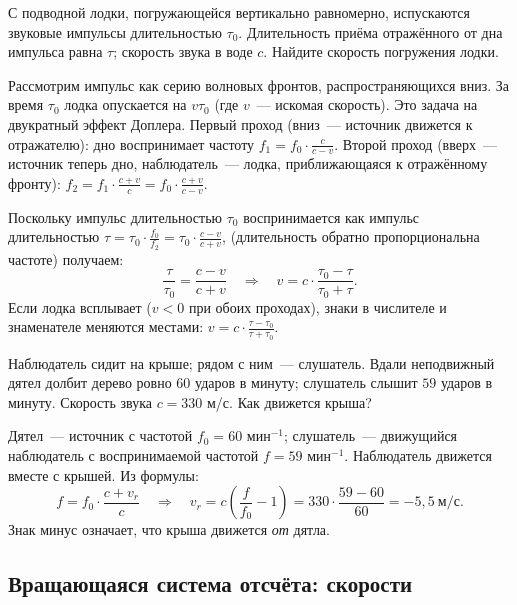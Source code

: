 \documentclass[../main.tex]{subfiles}
\begin{document}
\begin{example}
С подводной лодки, погружающейся вертикально равномерно,
испускаются звуковые импульсы длительностью $\tau_0$.
Длительность приёма отражённого от дна импульса равна $\tau$;
скорость звука в воде $c$. Найдите скорость погружения лодки.

Рассмотрим импульс как серию волновых фронтов,
распространяющихся вниз. За время $\tau_0$ лодка опускается
на $v\tau_0$ (где $v$~--- искомая скорость).
Это задача на двукратный эффект Доплера.
Первый проход (вниз~--- источник движется к отражателю):
дно воспринимает частоту $f_1 = f_0 \cdot \frac{c}{c - v}$.
Второй проход (вверх~--- источник теперь дно, наблюдатель~--- лодка,
приближающаяся к отражённому фронту):
$f_2 = f_1 \cdot \frac{c + v}{c} = f_0 \cdot \frac{c + v}{c - v}$.

Поскольку импульс длительностью $\tau_0$ воспринимается
как импульс длительностью $\tau = \tau_0 \cdot \frac{f_0}{f_2} = \tau_0 \cdot \frac{c - v}{c + v}$,
(длительность обратно пропорциональна частоте) получаем:
\[
    \frac{\tau}{\tau_0} = \frac{c - v}{c + v}
    \quad\Longrightarrow\quad
    v = c \cdot \frac{\tau_0 - \tau}{\tau_0 + \tau}.
\]
Если лодка всплывает ($v < 0$ при обоих проходах), знаки
в числителе и знаменателе меняются местами:
$v = c \cdot \frac{\tau - \tau_0}{\tau + \tau_0}$.
\end{example}

\begin{example}
Наблюдатель сидит на крыше; рядом с ним~--- слушатель.
Вдали неподвижный дятел долбит дерево ровно $60$ ударов в минуту;
слушатель слышит $59$ ударов в минуту.
Скорость звука $c = 330$ м/с. Как движется крыша?

Дятел~--- источник с частотой $f_0 = 60$ мин$^{-1}$;
слушатель~--- движущийся наблюдатель с воспринимаемой
частотой $f = 59$ мин$^{-1}$.
Наблюдатель движется вместе с крышей. Из формулы:
\[
    f = f_0 \cdot \frac{c + v_r}{c}
    \quad\Longrightarrow\quad
    v_r = c\left(\frac{f}{f_0} - 1\right) = 330 \cdot \frac{59 - 60}{60} = -5{,}5~\text{м/с}.
\]
Знак минус означает, что крыша движется \textit{от} дятла.
\end{example}

\subsection{Вращающаяся система отсчёта: скорости}
\end{document}
